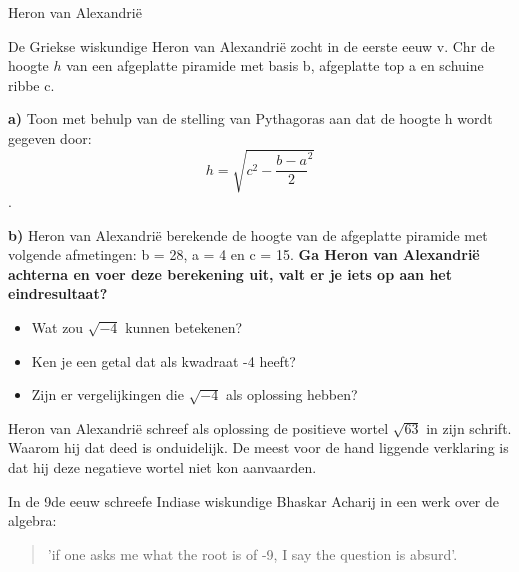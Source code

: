 \documentclass{ximera}
\begin{document}

\begin{exercise}{Heron van Alexandrië}

    De Griekse wiskundige Heron van Alexandrië zocht in de eerste eeuw v. Chr de hoogte \(h\) van een afgeplatte piramide met basis b, afgeplatte top a en schuine ribbe c. 

    \textbf{a)} 
    Toon met behulp van de stelling van Pythagoras aan dat de hoogte h wordt gegeven door: \[h = \sqrt{c^2 - {\frac{b-a}{2}}^2}\]. 

    \textbf{b)} 
    Heron van Alexandrië berekende de hoogte van de afgeplatte piramide met volgende afmetingen: b = 28, a = 4 en c = 15. 
    \textbf{Ga Heron van Alexandrië achterna en voer deze berekening uit, valt er je iets op aan het eindresultaat? }

\end{exercise}



\begin{denkvraag*}{}
\begin{itemize}
    \item Wat zou \(\sqrt{-4}\) kunnen betekenen? 
    \item Ken je een getal dat als kwadraat -4 heeft? 
    \item Zijn er vergelijkingen die \(\sqrt{-4}\) als oplossing hebben? 
\end{itemize}
\end{denkvraag*}

Heron van Alexandrië schreef als oplossing de positieve wortel \(\sqrt{63}\) in zijn schrift. 
Waarom hij dat deed is onduidelijk.
De meest voor de hand liggende verklaring is dat hij deze negatieve wortel niet kon aanvaarden. 

In de 9de eeuw schreefe Indiase wiskundige Bhaskar Acharij in een werk over de algebra: 

\begin{quote}
    'if one asks me what the root is of -9, I say the question is absurd'. 
\end{quote}


\end{document}
